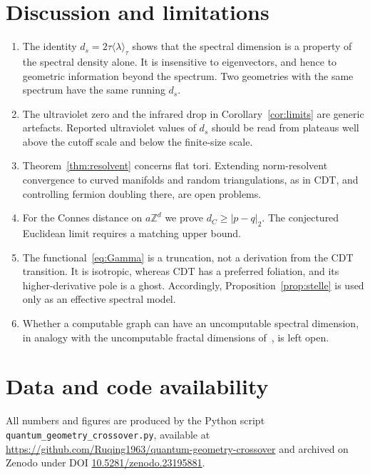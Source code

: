 \documentclass[11pt]{article}
\theoremstyle{remark}\newtheorem*{remark}{Remark}
\newcommand{\ZZ}{\mathbb{Z}}
\begin{document}
\section{Discussion and limitations}
\label{sec:discussion}
\begin{enumerate}
\item The identity $d_s=2\tau\langle\lambda\rangle_\tau$ shows that the spectral dimension is a property of the spectral density
alone. It is insensitive to eigenvectors, and hence to geometric information beyond the spectrum. Two
geometries with the same spectrum have the same running $d_s$.
\item The ultraviolet zero and the infrared drop in Corollary~\ref{cor:limits} are generic artefacts. Reported
ultraviolet values of $d_s$ should be read from plateaus well above the cutoff scale and below the finite-size
scale.
\item Theorem~\ref{thm:resolvent} concerns flat tori. Extending norm-resolvent convergence to curved manifolds
and random triangulations, as in CDT, and controlling fermion doubling there, are open problems.
\item For the Connes distance on $a\ZZ^d$ we prove $d_C\ge|p-q|_2$. The conjectured Euclidean limit requires a
matching upper bound.
\item The functional~\eqref{eq:Gamma} is a truncation, not a derivation from the CDT transition. It is isotropic,
whereas CDT has a preferred foliation, and its higher-derivative pole is a ghost. Accordingly,
Proposition~\ref{prop:stelle} is used only as an effective spectral model.
\item Whether a computable graph can have an uncomputable spectral dimension, in analogy with the uncomputable
fractal dimensions of~\cite{Chen2026_chaitin}, is left open.
\end{enumerate}

\section*{Data and code availability}
All numbers and figures are produced by the Python script \texttt{quantum\_geometry\_crossover.py}, available
at \url{https://github.com/Ruqing1963/quantum-geometry-crossover} and archived on Zenodo under DOI
\href{https://doi.org/10.5281/zenodo.23195881}{10.5281/zenodo.23195881}.

\appendix
\end{document}
